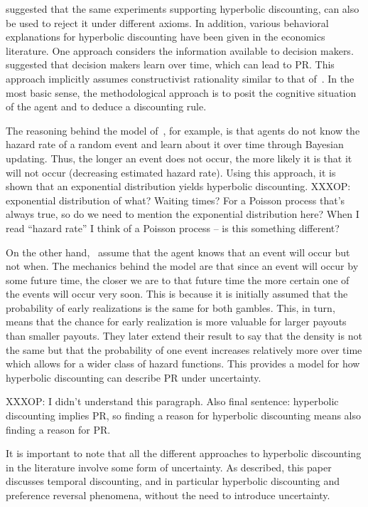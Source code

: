 \documentclass[11pt]{article}
\numberwithin{equation}{section}
\begin{document}
\citet{rubinstein2003economics} suggested that the same experiments supporting hyperbolic discounting, can also be used to reject it under different axioms. In addition, various behavioral explanations for hyperbolic discounting have been given in the economics literature. One approach considers the information available to decision makers.~\citet{sozou1998hyperbolic,dasgupta2005uncertainty} suggested that decision makers learn over time, which can lead to PR. This approach implicitly assumes constructivist rationality similar to that of~\citet{smith2003constructivist}. In the most basic sense, the methodological approach is to posit the cognitive situation of the agent and to deduce a discounting rule.

The reasoning behind the model of~\citet{sozou1998hyperbolic}, for example, is that agents do not know the hazard rate of a random event and learn about it over time through Bayesian updating. Thus, the longer an event does not occur, the more likely it is that it will not occur (decreasing estimated hazard rate). Using this approach, it is shown that an exponential distribution yields hyperbolic discounting.
XXXOP: exponential distribution of what? Waiting times? For a Poisson process that's always true, so do we need to mention the exponential distribution here? When I read ``hazard rate'' I think of a Poisson process -- is this something different?

On the other hand,~\citet{dasgupta2005uncertainty} assume that the agent knows that an event will occur but not when. The mechanics behind the model are that since an event will occur by some future time, the closer we are to that future time the more certain one of the events will occur very soon. This is because it is initially assumed that the probability of early realizations is the same for both gambles. This, in turn, means that the chance for early realization is more valuable for larger payouts than smaller payouts. They later extend their result to say that the density is not the same but that the probability of one event increases relatively more over time which allows for a wider class of hazard functions. This provides a model for how hyperbolic discounting can describe PR under uncertainty.

XXXOP: I didn't understand this paragraph. Also final sentence: hyperbolic discounting implies PR, so finding a reason for hyperbolic discounting means also finding a reason for PR.

It is important to note that all the different approaches to hyperbolic discounting in the literature involve some form of uncertainty. As described, this paper discusses temporal discounting, and in particular hyperbolic discounting and preference reversal phenomena, without the need to introduce uncertainty.
\end{document}
